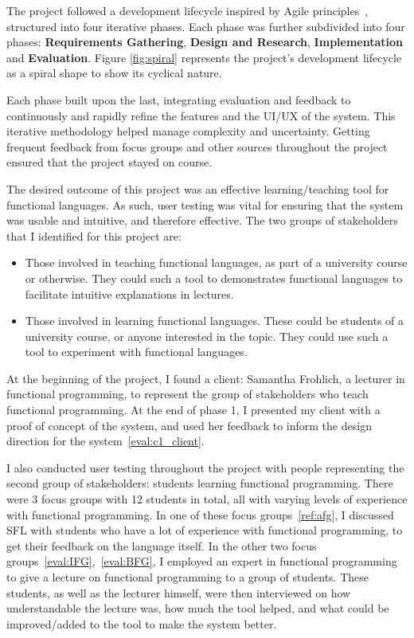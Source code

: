 The project followed a development lifecycle inspired by Agile principles~\cite{agilemanifesto2001}, structured into four iterative phases. 
Each phase was further subdivided into four phases: \textbf{Requirements Gathering}, \textbf{Design and Research}, \textbf{Implementation} and \textbf{Evaluation}. Figure \ref{fig:spiral} represents the project's development lifecycle as a spiral shape to show its cyclical nature. 

Each phase built upon the last, integrating evaluation and feedback to continuously and rapidly refine the features and the UI/UX of the system. This iterative methodology helped manage complexity and uncertainty. Getting frequent feedback from focus groups and other sources throughout the project ensured that the project stayed on course. 

The desired outcome of this project was an effective learning/teaching tool for functional languages. As such, user testing was vital for ensuring that the system was usable and intuitive, and therefore effective. The two groups of stakeholders that I identified for this project are:
\begin{itemize}
  \item Those involved in teaching functional languages, as part of a university course or otherwise. They could such a tool to demonstrates functional languages to facilitate intuitive explanations in lectures.
  \item Those involved in learning functional languages. These could be students of a university course, or anyone interested in the topic. They could use such a tool to experiment with functional languages. 
\end{itemize}

\noindent At the beginning of the project, I found a client: Samantha Frohlich, a lecturer in functional programming, to represent the group of stakeholders who teach functional programming. At the end of phase 1, I presented my client with a proof of concept of the system, and used her feedback to inform the design direction for the system~\ref{eval:c1_client}. 

I also conducted user testing throughout the project with people representing the second group of stakeholders: students learning functional programming. There were 3 focus groups with 12 students in total, all with varying levels of experience with functional programming. In one of these focus groups~\ref{ref:afg}, I discussed \ac{SFL} with students who have a lot of experience with functional programming, to get their feedback on the language itself. In the other two focus groups~\ref{eval:IFG},~\ref{eval:BFG}, I employed an expert in functional programming to give a lecture on functional programming to a group of students. These students, as well as the lecturer himself, were then interviewed on how understandable the lecture was, how much the tool helped, and what could be improved/added to the tool to make the system better. 

